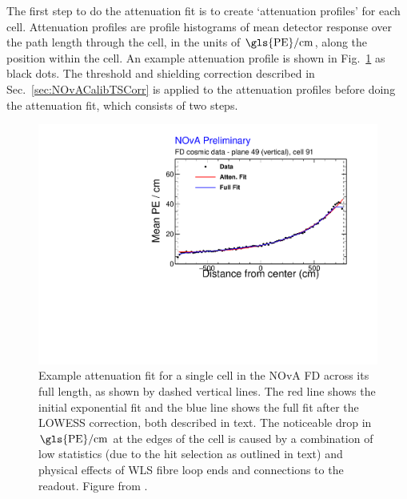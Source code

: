 The first step to do the attenuation fit is to create `attenuation profiles' for each cell. Attenuation profiles are profile histograms of mean detector response over the path length through the cell, in the units of $\unit{\gls{PE}/cm}$, along the position within the cell. An example attenuation profile is shown in Fig.~\ref{fig:NOvACalibrationAttenuationFit} as black dots. The threshold and shielding correction described in Sec.~\ref{sec:NOvACalibTSCorr} is applied to the attenuation profiles before doing the attenuation fit, which consists of two steps.

\begin{figure}
    \centering
    \includegraphics[width=.7\textwidth]{Plots/NOvAExperiment/ExampleAttenuationFit.pdf}
    \caption[Example attenuation fit for NOvA relative calibration]{Example attenuation fit for a single cell in the \acrshort{NOvA} \acrshort{FD} across its full length, as shown by dashed vertical lines. The red line shows the initial exponential fit and the blue line shows the full fit after the \acrshort{LOWESS} correction, both described in text. The noticeable drop in $\unit{\gls{PE}/cm}$ at the edges of the cell is caused by a combination of low statistics (due to the hit selection as outlined in text) and physical effects of \gls{WLS} fibre loop ends and connections to the readout. Figure from \cite{totfit_fd_datafitX_049_091.pdf}.}
    \label{fig:NOvACalibrationAttenuationFit}
\end{figure}

